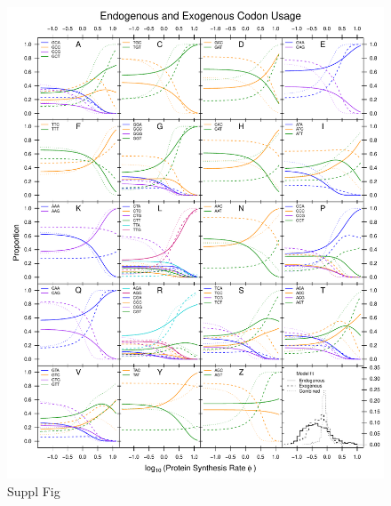\documentclass[12pt]{article}
\begin{document}
\clearpage
\begin{figure}[H]
     \centering
	\includegraphics[width=\textwidth]{img/CUB_cleft_main.pdf}
	\caption{Suppl Fig}
	\label{fig:cub_all_sets}
\end{figure}
\end{document}
